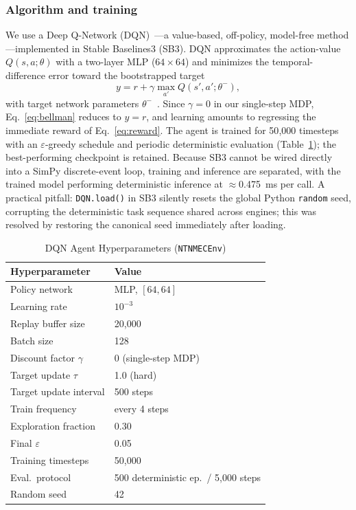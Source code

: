 \documentclass[conference,comsoc,twoside,caption=false]{IEEEtran}
\let\MYoriglatexcaption\caption
\renewcommand{\caption}[2][\relax]{\MYoriglatexcaption[#2]{#2}}
\theoremstyle{definition}
\begin{document}
\subsubsection*{Algorithm and training}
We use a Deep Q-Network (DQN)~\cite{mnih2015}---a value-based, off-policy,
model-free method---implemented in Stable Baselines3 (SB3). DQN approximates the
action-value $Q(s,a;\theta)$ with a two-layer MLP ($64\times64$) and minimizes
the temporal-difference error toward the bootstrapped target
\begin{equation}
y = r + \gamma \max_{a'} Q(s',a';\theta^{-}),
\label{eq:bellman}
\end{equation}
with target network parameters $\theta^{-}$~\cite{sutton2018,mnih2015}. Since
$\gamma = 0$ in our single-step MDP, Eq.~\eqref{eq:bellman} reduces to
$y = r$, and learning amounts to regressing the immediate reward of
Eq.~\eqref{eq:reward}. The agent is trained for 50{,}000 timesteps with an
$\varepsilon$-greedy schedule and periodic deterministic evaluation
(Table~\ref{tab:dqn}); the best-performing checkpoint is retained. Because SB3
cannot be wired directly into a SimPy discrete-event loop, training and
inference are separated, with the trained model performing deterministic
inference at $\approx$0.475~ms per call. A practical pitfall: \texttt{DQN.load()}
in SB3 silently resets the global Python \texttt{random} seed, corrupting the
deterministic task sequence shared across engines; this was resolved by
restoring the canonical seed immediately after loading.

\begin{table}[!t]
\centering
\caption{DQN Agent Hyperparameters (\texttt{NTNMECEnv})}
\label{tab:dqn}
\footnotesize
\begin{tabular}{p{4.3cm}p{3.3cm}}
\toprule
\textbf{Hyperparameter} & \textbf{Value} \\
\midrule
Policy network        & MLP, $[64, 64]$ \\
Learning rate         & $10^{-3}$ \\
Replay buffer size    & 20{,}000 \\
Batch size            & 128 \\
Discount factor $\gamma$ & 0 (single-step MDP) \\
Target update $\tau$  & 1.0 (hard) \\
Target update interval & 500 steps \\
Train frequency       & every 4 steps \\
Exploration fraction  & 0.30 \\
Final $\varepsilon$   & 0.05 \\
Training timesteps    & 50{,}000 \\
Eval.\ protocol       & 500 deterministic ep.\ / 5{,}000 steps \\
Random seed           & 42 \\
\bottomrule
\end{tabular}
\end{table}
\end{document}
